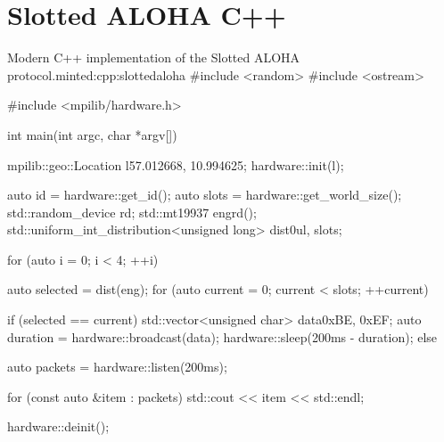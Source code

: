 \chapter{Slotted ALOHA C++}\label{app:slottedaloha}
\begin{cpp}{Modern C++ implementation of the Slotted ALOHA protocol.}{minted:cpp:slottedaloha}
#include <random>
#include <ostream>

#include <mpilib/hardware.h>

int main(int argc, char *argv[]) {
    mpilib::geo::Location l{57.012668, 10.994625};
    hardware::init(l);

    auto id = hardware::get_id();
    auto slots = hardware::get_world_size();
    std::random_device rd{};
    std::mt19937 eng{rd()};
    std::uniform_int_distribution<unsigned long> dist{0ul, slots};

    for (auto i = 0; i < 4; ++i) {
        auto selected = dist(eng);
        for (auto current = 0; current < slots; ++current) {
            if (selected == current) {
                std::vector<unsigned char> data{0xBE, 0xEF};
                auto duration = hardware::broadcast(data);
                hardware::sleep(200ms - duration);
            } else {
                auto packets = hardware::listen(200ms);
                
                for (const auto &item : packets) {
                    std::cout << item << std::endl;    
                }
            }
        }
    }

    hardware::deinit();
}
\end{cpp}